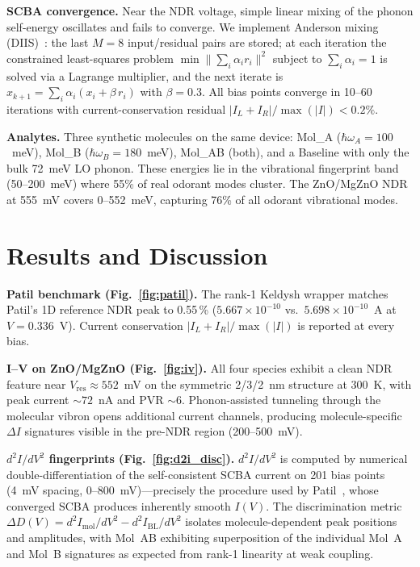 \documentclass[conference]{IEEEtran}
\begin{document}
\textbf{SCBA convergence.} Near the NDR voltage, simple linear mixing
of the phonon self-energy oscillates and fails to converge.
We implement Anderson mixing (DIIS)~\cite{anderson1965}: the last $M=8$
input/residual pairs are stored; at each iteration the constrained
least-squares problem
$\min\|\sum_i \alpha_i r_i\|^2$ subject to $\sum_i\alpha_i=1$ is solved
via a Lagrange multiplier, and the next iterate is
$x_{k+1}=\sum_i\alpha_i(x_i+\beta\,r_i)$ with $\beta=0.3$.
All bias points converge in 10--60 iterations with current-conservation
residual $|I_L+I_R|/\max(|I|) < 0.2\%$.

\textbf{Analytes.} Three synthetic molecules on the same device:
Mol\_A ($\hbar\omega_A = 100$~meV), Mol\_B ($\hbar\omega_B = 180$~meV),
Mol\_AB (both), and a Baseline with only the bulk 72~meV LO phonon.
These energies lie in the vibrational fingerprint band (50--200~meV)
where 55\% of real odorant modes cluster. The ZnO/MgZnO NDR at 555~mV
covers 0--552~meV, capturing 76\% of all odorant vibrational modes.

\section{Results and Discussion}
\textbf{Patil benchmark (Fig.~\ref{fig:patil}).} The rank-1 Keldysh wrapper
matches Patil's 1D reference NDR peak to 0.55\,\% ($5.667\!\times\!10^{-10}$
vs.\ $5.698\!\times\!10^{-10}$~A at $V = 0.336$~V). Current conservation
$|I_L + I_R|/\max(|I|)$ is reported at every bias.

\textbf{I--V on ZnO/MgZnO (Fig.~\ref{fig:iv}).} All four species
exhibit a clean NDR feature near $V_{\mathrm{res}} \approx 552$~mV on the
symmetric 2/3/2~nm structure at 300~K, with peak current $\sim 72$~nA and
PVR $\sim 6$. Phonon-assisted tunneling through the molecular vibron
opens additional current channels, producing molecule-specific
$\Delta I$ signatures visible in the pre-NDR region (200--500~mV).

\textbf{$d^2I/dV^2$ fingerprints (Fig.~\ref{fig:d2i_disc}).}
$d^2I/dV^2$ is computed by numerical double-differentiation of the
self-consistent SCBA current on 201 bias points (4~mV spacing,
0--800~mV)---precisely the procedure used by Patil~\cite{patil2018},
whose converged SCBA produces inherently smooth $I(V)$. The discrimination
metric $\Delta D(V) = d^2I_{\mathrm{mol}}/dV^2 - d^2I_{\mathrm{BL}}/dV^2$
isolates molecule-dependent peak positions and amplitudes, with Mol~AB
exhibiting superposition of the individual Mol~A and Mol~B signatures
as expected from rank-1 linearity at weak coupling.
\end{document}
